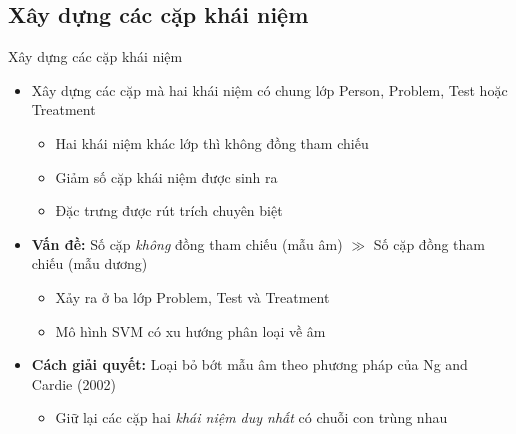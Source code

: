 \subsection{Xây dựng các cặp khái niệm}
\begin{frame}{Xây dựng các cặp khái niệm}
\putlogo
\begin{itemize}
	\item Xây dựng các cặp mà hai khái niệm có chung lớp Person, Problem, Test hoặc Treatment
	\begin{itemize}
		\item Hai khái niệm khác lớp thì không đồng tham chiếu
		\item Giảm số cặp khái niệm được sinh ra
		\item Đặc trưng được rút trích chuyên biệt
	\end{itemize}
	\item \textbf{Vấn đề:} Số cặp \emph{không} đồng tham chiếu (mẫu âm) $\gg$ Số cặp đồng tham chiếu (mẫu dương)
	\begin{itemize}
		\item Xảy ra ở ba lớp Problem, Test và Treatment
		\item Mô hình SVM có xu hướng phân loại về âm
	\end{itemize}
	\item \textbf{Cách giải quyết:} Loại bỏ bớt mẫu âm theo phương pháp của Ng and Cardie (2002)
	\begin{itemize}
		\item Giữ lại các cặp hai \textit{khái niệm duy nhất} có chuỗi con trùng nhau
	\end{itemize}
\end{itemize}
\end{frame}

